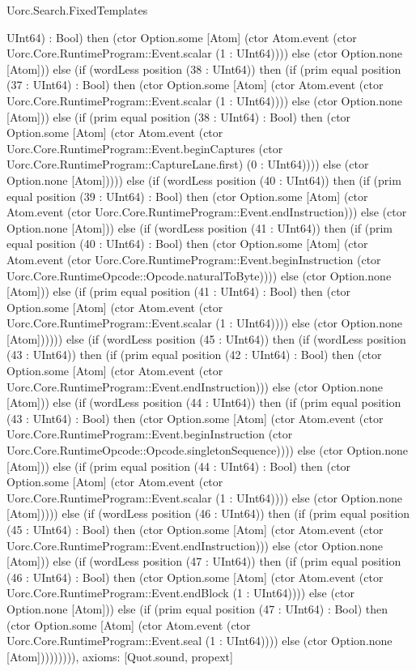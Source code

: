 \begin{lexlean}{Uorc.Search.FixedTemplates}
\begin{semanticmodule}
{UInt64) : Bool) then (ctor Option.some [Atom] (ctor Atom.event (ctor Uorc.Core.RuntimeProgram::Event.scalar (1 : UInt64)))) else (ctor Option.none [Atom])) else (if (wordLess position (38 : UInt64)) then (if (prim equal position (37 : UInt64) : Bool) then (ctor Option.some [Atom] (ctor Atom.event (ctor Uorc.Core.RuntimeProgram::Event.scalar (1 : UInt64)))) else (ctor Option.none [Atom])) else (if (prim equal position (38 : UInt64) : Bool) then (ctor Option.some [Atom] (ctor Atom.event (ctor Uorc.Core.RuntimeProgram::Event.beginCaptures (ctor Uorc.Core.RuntimeProgram::CaptureLane.first) (0 : UInt64)))) else (ctor Option.none [Atom])))) else (if (wordLess position (40 : UInt64)) then (if (prim equal position (39 : UInt64) : Bool) then (ctor Option.some [Atom] (ctor Atom.event (ctor Uorc.Core.RuntimeProgram::Event.endInstruction))) else (ctor Option.none [Atom])) else (if (wordLess position (41 : UInt64)) then (if (prim equal position (40 : UInt64) : Bool) then (ctor Option.some [Atom] (ctor Atom.event (ctor Uorc.Core.RuntimeProgram::Event.beginInstruction (ctor Uorc.Core.RuntimeOpcode::Opcode.naturalToByte)))) else (ctor Option.none [Atom])) else (if (prim equal position (41 : UInt64) : Bool) then (ctor Option.some [Atom] (ctor Atom.event (ctor Uorc.Core.RuntimeProgram::Event.scalar (1 : UInt64)))) else (ctor Option.none [Atom]))))) else (if (wordLess position (45 : UInt64)) then (if (wordLess position (43 : UInt64)) then (if (prim equal position (42 : UInt64) : Bool) then (ctor Option.some [Atom] (ctor Atom.event (ctor Uorc.Core.RuntimeProgram::Event.endInstruction))) else (ctor Option.none [Atom])) else (if (wordLess position (44 : UInt64)) then (if (prim equal position (43 : UInt64) : Bool) then (ctor Option.some [Atom] (ctor Atom.event (ctor Uorc.Core.RuntimeProgram::Event.beginInstruction (ctor Uorc.Core.RuntimeOpcode::Opcode.singletonSequence)))) else (ctor Option.none [Atom])) else (if (prim equal position (44 : UInt64) : Bool) then (ctor Option.some [Atom] (ctor Atom.event (ctor Uorc.Core.RuntimeProgram::Event.scalar (1 : UInt64)))) else (ctor Option.none [Atom])))) else (if (wordLess position (46 : UInt64)) then (if (prim equal position (45 : UInt64) : Bool) then (ctor Option.some [Atom] (ctor Atom.event (ctor Uorc.Core.RuntimeProgram::Event.endInstruction))) else (ctor Option.none [Atom])) else (if (wordLess position (47 : UInt64)) then (if (prim equal position (46 : UInt64) : Bool) then (ctor Option.some [Atom] (ctor Atom.event (ctor Uorc.Core.RuntimeProgram::Event.endBlock (1 : UInt64)))) else (ctor Option.none [Atom])) else (if (prim equal position (47 : UInt64) : Bool) then (ctor Option.some [Atom] (ctor Atom.event (ctor Uorc.Core.RuntimeProgram::Event.seal (1 : UInt64)))) else (ctor Option.none [Atom])))))))),
  axioms: [Quot.sound, propext]
}


\end{semanticmodule}
\end{lexlean}
